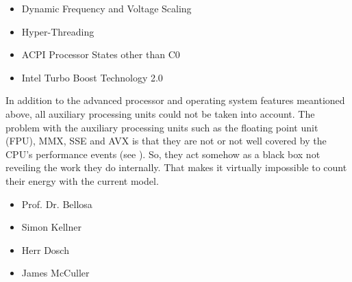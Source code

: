 \begin{itemize}

\item Dynamic Frequency and Voltage Scaling \cite{wiki:DVFS}

\item Hyper-Threading \cite{wiki:HT}

\item ACPI Processor States other than C0 \cite{wiki:ACPI}

\item Intel\TReg{} Turbo Boost Technology 2.0 \cite{wiki:IntelTurboBoost}

\end{itemize}

In addition to the advanced processor and operating system features meantioned
above, all auxiliary processing units could not be taken into account. The
problem with the auxiliary processing units such as the floating point unit
(FPU), MMX\cite{wiki:MMX}, SSE\cite{wiki:SSE} and AVX\cite{wiki:AVX} is that
they are not or not well covered by the CPU's performance events (see
\cite{intel2011events}). So, they act somehow as a black box not reveiling the
work they do internally. That makes it virtually impossible to count their
energy with the current model.


\begin{itemize}

\item Prof. Dr. Bellosa

\item Simon Kellner

\item Herr Dosch

\item James McCuller

\end{itemize}

